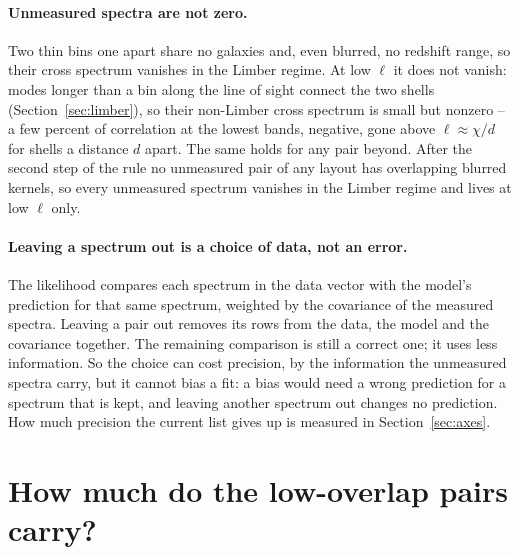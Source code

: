 \documentclass[11pt]{article}
\begin{document}
\paragraph{Unmeasured spectra are not zero.}
Two thin bins one apart share no galaxies and, even blurred, no
redshift range, so their cross spectrum vanishes in the Limber regime.
At low $\ell$ it does not vanish: modes longer than a bin along the
line of sight connect the two shells (Section~\ref{sec:limber}), so
their non-Limber cross spectrum is small but nonzero -- a few
percent of correlation at the lowest bands, negative, gone above
$\ell \approx \chi/d$ for shells a distance $d$ apart.  The same
holds for any pair beyond.  After the second step of the rule no unmeasured pair of
any layout has overlapping blurred kernels, so every unmeasured
spectrum vanishes in the Limber regime and lives at low $\ell$ only.

\paragraph{Leaving a spectrum out is a choice of data, not an error.}
The likelihood compares each spectrum in the data vector with the
model's prediction for that same spectrum, weighted by the covariance
of the measured spectra.  Leaving a pair out removes its rows from the
data, the model and the covariance together.  The remaining comparison
is still a correct one; it uses less information.  So the choice can
cost precision, by the information the unmeasured spectra carry, but it
cannot bias a fit: a bias would need a wrong prediction for a spectrum
that is kept, and leaving another spectrum out changes no prediction.
How much precision the current list gives up is measured in
Section~\ref{sec:axes}.

\section{How much do the low-overlap pairs carry?}
\label{sec:threshold}
\end{document}
